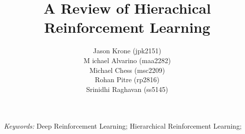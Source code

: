 \documentclass[12pt]{article}
\title{%
\textbf{A Review of Hierachical Reinforcement Learning}
}
\author{
Jason Krone (jpk2151) \\
M%
ichael Alvarino (maa2282) \\
Michael Chess (msc2209) \\
Rohan Pitre (rp2816) \\
Srinidhi Raghavan (ss5145) \\
}
\begin{document}
\maketitle
\bigskip



\emph{Keywords:}
Deep Reinforcement Learning;
Hierarchical Reinforcement Learning;

\clearpage
\glsresetall{}



\clearpage



\clearpage



\clearpage



\clearpage




\clearpage
\appendix
\end{document}
